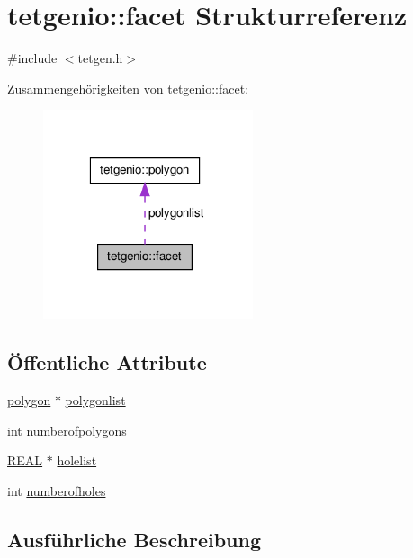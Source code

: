 \hypertarget{structtetgenio_1_1facet}{\section{tetgenio\-:\-:facet Strukturreferenz}
\label{structtetgenio_1_1facet}
}


{\ttfamily \#include $<$tetgen.\-h$>$}



Zusammengehörigkeiten von tetgenio\-:\-:facet\-:\nopagebreak
\begin{figure}[H]
\begin{center}
\leavevmode
\includegraphics[width=175pt]{structtetgenio_1_1facet__coll__graph}
\end{center}
\end{figure}
\subsection*{Öffentliche Attribute}
\begin{DoxyCompactItemize}
\item 
\hyperlink{structtetgenio_1_1polygon}{polygon} $\ast$ \hyperlink{structtetgenio_1_1facet_ad73474fc4f07efdd714f0441948c5dfa}{polygonlist}
\item 
int \hyperlink{structtetgenio_1_1facet_a845d93a1341532b2f0de8b1e75a5d0bb}{numberofpolygons}
\item 
\hyperlink{tetgen_8h_a4b654506f18b8bfd61ad2a29a7e38c25}{R\-E\-A\-L} $\ast$ \hyperlink{structtetgenio_1_1facet_aecc34fbcd7087b45baecf2ba43d57757}{holelist}
\item 
int \hyperlink{structtetgenio_1_1facet_acc9857df4007aa20199f8979353339c7}{numberofholes}
\end{DoxyCompactItemize}


\subsection{Ausführliche Beschreibung}


